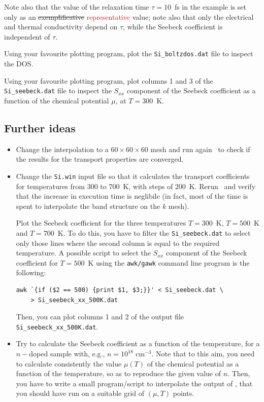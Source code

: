 \documentclass[a4paper,11pt,twoside]{article}
\def\tent#1{\textcolor{red}{#1}}     %
\begin{document}
Note also that the value of the relaxation time $\tau=10$~fs in the
example is set only as an \sout{exemplificative} \tent{representative}
value; note also that only the electrical and thermal conductivity
depend on $\tau$, while the Seebeck coefficient is independent of
$\tau$.

Using your favourite plotting program, plot the {\tt Si\_boltzdos.dat} file to inspect the DOS.

Using your favourite plotting program, plot columns 1 and 3 of the {\tt Si\_seebeck.dat} file to inspect the $S_{xx}$ component of the Seebeck coefficient as a function of the chemical potential $\mu$, at $T=300$~K.

\subsection*{Further ideas}

\begin{itemize}
\item Change the interpolation to a $60\times 60\times 60$ mesh and run again \postw\ to check if the results for the transport properties are converged. 

\item Change the {\tt Si.win} input file so that it calculates the transport coefficients for temperatures from 300 to 700~K, with steps of 200~K. Rerun \postw\ and verify that the increase in execution time is neglibile (in fact, most of the time is spent to interpolate the band structure on the $k$ mesh).

Plot the Seebeck coefficient for the three temperatures $T=300$~K, $T=500$~K and $T=700$~K. To do this, you have to filter the {\tt Si\_seebeck.dat} to select only those lines where the second column is equal to the required temperature. A possible script to select the $S_{xx}$ component of the Seebeck coefficient for $T=500$~K using the {\tt awk/gawk} command line program is the following:
\begin{verbatim}
awk `{if ($2 == 500) {print $1, $3;}}' < Si_seebeck.dat \
    > Si_seebeck_xx_500K.dat
\end{verbatim}
Then, you can plot columns 1 and 2 of the output file \verb#Si_seebeck_xx_500K.dat#.
\item Try to calculate the Seebeck coefficient as a function of the temperature, for a $n-$doped sample with, e.g., $n=10^{18}$ cm$^{-3}$. Note that to this aim, you need to calculate consistently the value $\mu(T)$ of the chemical potential as a function of the temperature, so as to reproduce the given value of $n$. Then, you have to write a small program/script to interpolate the output of \bw, that you should have run on a suitable grid of $(\mu,T)$ points.
\end{itemize}
\end{document}
